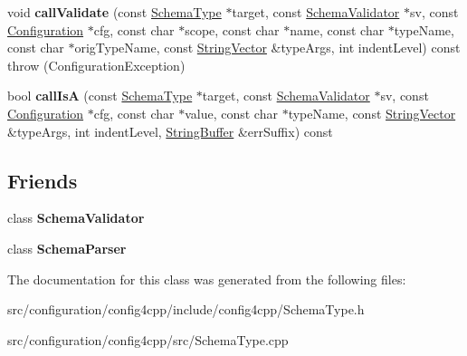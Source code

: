 \begin{DoxyCompactItemize}
\item 
\hypertarget{classCONFIG4CPP__NAMESPACE_1_1SchemaType_a0c6f1eea6ea1f6c84fe013a9b12fa2a7}{void {\bfseries call\-Validate} (const \hyperlink{classCONFIG4CPP__NAMESPACE_1_1SchemaType}{Schema\-Type} $\ast$target, const \hyperlink{classCONFIG4CPP__NAMESPACE_1_1SchemaValidator}{Schema\-Validator} $\ast$sv, const \hyperlink{classCONFIG4CPP__NAMESPACE_1_1Configuration}{Configuration} $\ast$cfg, const char $\ast$scope, const char $\ast$name, const char $\ast$type\-Name, const char $\ast$orig\-Type\-Name, const \hyperlink{classCONFIG4CPP__NAMESPACE_1_1StringVector}{String\-Vector} \&type\-Args, int indent\-Level) const   throw (\-Configuration\-Exception)}\label{classCONFIG4CPP__NAMESPACE_1_1SchemaType_a0c6f1eea6ea1f6c84fe013a9b12fa2a7}

\item 
\hypertarget{classCONFIG4CPP__NAMESPACE_1_1SchemaType_a83f255330f3ae79110adbccf9e6ecc06}{bool {\bfseries call\-Is\-A} (const \hyperlink{classCONFIG4CPP__NAMESPACE_1_1SchemaType}{Schema\-Type} $\ast$target, const \hyperlink{classCONFIG4CPP__NAMESPACE_1_1SchemaValidator}{Schema\-Validator} $\ast$sv, const \hyperlink{classCONFIG4CPP__NAMESPACE_1_1Configuration}{Configuration} $\ast$cfg, const char $\ast$value, const char $\ast$type\-Name, const \hyperlink{classCONFIG4CPP__NAMESPACE_1_1StringVector}{String\-Vector} \&type\-Args, int indent\-Level, \hyperlink{classCONFIG4CPP__NAMESPACE_1_1StringBuffer}{String\-Buffer} \&err\-Suffix) const }\label{classCONFIG4CPP__NAMESPACE_1_1SchemaType_a83f255330f3ae79110adbccf9e6ecc06}

\end{DoxyCompactItemize}
\subsection*{Friends}
\begin{DoxyCompactItemize}
\item 
\hypertarget{classCONFIG4CPP__NAMESPACE_1_1SchemaType_af8cde46b6af04882af19fea29321f27b}{class {\bfseries Schema\-Validator}}\label{classCONFIG4CPP__NAMESPACE_1_1SchemaType_af8cde46b6af04882af19fea29321f27b}

\item 
\hypertarget{classCONFIG4CPP__NAMESPACE_1_1SchemaType_aacf417b319ed18d9192f294e9267b3b7}{class {\bfseries Schema\-Parser}}\label{classCONFIG4CPP__NAMESPACE_1_1SchemaType_aacf417b319ed18d9192f294e9267b3b7}

\end{DoxyCompactItemize}


The documentation for this class was generated from the following files\-:\begin{DoxyCompactItemize}
\item 
src/configuration/config4cpp/include/config4cpp/Schema\-Type.\-h\item 
src/configuration/config4cpp/src/Schema\-Type.\-cpp\end{DoxyCompactItemize}
